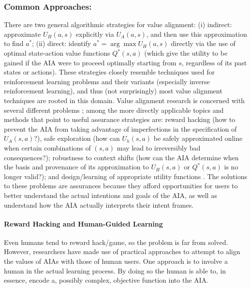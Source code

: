 \subsubsection{Common Approaches:}
There are two general algorithmic strategies for value alignment: (i) indirect: approximate $U_H(a,s)$ explicitly via $U_A(a,s)$, and then use this approximation to find $a^*$; (ii) direct: identify $a^* = \arg \max U_H(a,s)$ directly via the use of optimal state-action value functions $Q^*(s,a)$ (which give the utility to be gained if the AIA were to proceed optimally starting from $s$, regardless of its past states or actions). 
These strategies closely resemble techniques used for reinforcement learning problems and their variants (especially inverse reinforcement learning), and thus (not surprisingly) most value alignment techniques are rooted in this domain. 
Value alignment research is concerned with several different problems \cite{Gordon_Worley2018-xy,Amodei2016-xi}; among the more directly applicable topics and methods that point to useful assurance strategies are: reward hacking (how to prevent the AIA from taking advantage of imperfections in the specification of $U_A(s,a)$?), safe exploration (how can $U_h(s,a)$ be safely approximated online when certain combinations of $(s,a)$ may lead to irreversibly bad consequences?); robustness to context shifts (how can the AIA determine when the basis and provenance of its approximation to $U_H(s,a)$ or $Q^*(s,a)$ is no longer valid?); and design/learning of appropriate utility functions \cite{Hadfield-Menell2016-ws,Da_Veiga2012-gh,Garcia2015-rs}. The solutions to these problems are assurances because they afford opportunities for  users to better understand the actual intentions and goals of the AIA, as well as understand how the AIA actually interprets their intent frames. 


\paragraph{Reward Hacking and Human-Guided Learning}
Even humans tend to reward hack/game, so the problem is far from solved. However, researchers have made use of practical approaches to attempt to align the values of AIAs with those of human users. One approach is to involve a human in the actual learning process. By doing so the human is able to, in essence, encode a, possibly complex, objective function into the AIA.

